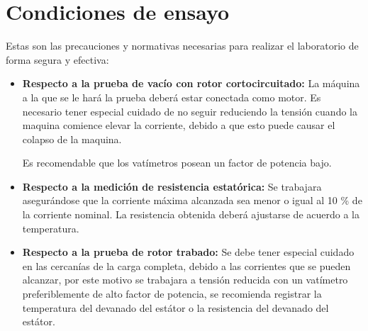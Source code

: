 \documentclass[11pt,letterpaper]{article}     %
\begin{document}
\section{Condiciones de ensayo}
Estas son las precauciones y normativas necesarias para realizar el laboratorio de forma segura y efectiva: 
\begin{itemize}
    \item \textbf{Respecto a la prueba de vacío con rotor cortocircuitado:} La máquina a la que se le hará la prueba deberá estar conectada como motor. Es necesario tener especial cuidado de no seguir reduciendo la tensión cuando la maquina comience elevar la corriente, debido a que esto puede causar el colapso de la maquina.
   
    Es recomendable que los vatímetros posean un factor de potencia bajo.
    \item \textbf{Respecto a la medición de resistencia estatórica:} Se trabajara asegurándose que la corriente máxima alcanzada sea menor o igual al 10 \% de la corriente nominal. La resistencia obtenida deberá ajustarse de acuerdo a la temperatura.
    \item \textbf{Respecto a la prueba de rotor trabado:} Se debe tener especial cuidado en las cercanías de la carga completa, debido a las corrientes que se pueden alcanzar, por este motivo se trabajara a tensión reducida con un vatímetro preferiblemente de alto factor de potencia, se recomienda registrar  la temperatura del devanado del estátor o la resistencia del devanado del estátor.
    

\end{itemize}
\end{document}
